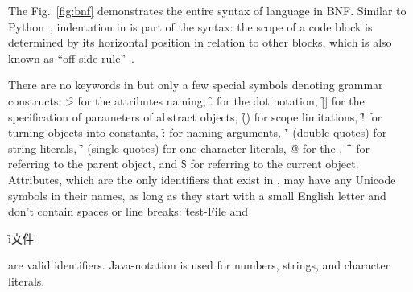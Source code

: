 \newcommand\sntx[1]{{\color{blue!50!black}\sffamily #1}}

The Fig.~\ref{fig:bnf} demonstrates the entire syntax of \eo{} language in BNF.
Similar to Python~\citep{lutz2013learning}, indentation in \eo{} is part of the syntax:
the scope of a code block is determined by its horizontal position
in relation to other blocks, which is also known as ``off-side rule''~\citep{landin1966next}.

There are no keywords in \eo{} but only a few special symbols
denoting grammar constructs:
  \f{>} for the attributes naming,
  \f{.} for the dot notation,
  \f{[]} for the specification of parameters of abstract objects,
  \f{()} for scope limitations,
  \f{!} for turning objects into constants,
  \f{:} for naming arguments,
  \f{"} (double quotes) for string literals,
  \f{'} (single quotes) for one-character literals,
  \f{@} for the ,
  \f{\^{}} for referring to the parent object,
  and
  \f{\$} for referring to the current object.
Attributes, which are the only identifiers that exist in \eo{}, may have
any Unicode symbols in their names, as long as they start with a small English letter
and don't contain spaces or line breaks:
\f{test-File} and
\begin{CJK}{UTF8}{gbsn}
\f{i文件}
\end{CJK}
 are valid identifiers.
Java-notation is used for numbers, strings, and character literals.

